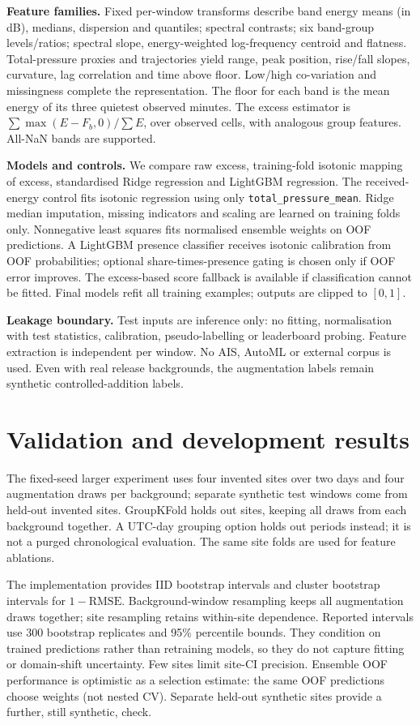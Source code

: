 \documentclass[a4paper,11pt]{article}
\begin{document}
\textbf{Feature families.} Fixed per-window transforms describe band energy
means (in dB), medians, dispersion and quantiles; spectral contrasts; six
band-group levels/ratios; spectral slope, energy-weighted log-frequency
centroid and flatness. Total-pressure proxies and trajectories yield range,
peak position, rise/fall slopes, curvature, lag correlation and time above
floor. Low/high co-variation and missingness complete the representation.
The floor for each band is the mean energy of its three quietest observed
minutes. The excess estimator is $\sum\max(E-F_b,0)/\sum E$, over observed
cells, with analogous group features. All-NaN bands are supported.

\textbf{Models and controls.} We compare raw excess, training-fold isotonic
mapping of excess, standardised Ridge regression and LightGBM regression.
The received-energy control fits isotonic regression using only
\texttt{total\_pressure\_mean}. Ridge median imputation, missing indicators
and scaling are learned on training folds only. Nonnegative least squares
fits normalised ensemble weights on OOF predictions. A LightGBM presence
classifier receives isotonic calibration from OOF probabilities; optional
share-times-presence gating is chosen only if OOF error improves. The
excess-based score fallback is available if classification cannot be fitted.
Final models refit all training examples; outputs are clipped to $[0,1]$.

\textbf{Leakage boundary.} Test inputs are inference only: no fitting,
normalisation with test statistics, calibration, pseudo-labelling or
leaderboard probing. Feature extraction is independent per window. No AIS,
AutoML or external corpus is used. Even with real release backgrounds,
the augmentation labels remain synthetic controlled-addition labels.

\newpage
\section{Validation and development results}
The fixed-seed larger experiment uses four invented sites over two days and
four augmentation draws per background; \HeldoutCount{} separate synthetic
test windows come from held-out invented sites. GroupKFold holds out sites,
keeping all draws from each background together. A UTC-day grouping option
holds out periods instead; it is not a purged chronological evaluation.
The same site folds are used for feature ablations.

The implementation provides IID bootstrap intervals and cluster bootstrap
intervals for $1-\mathrm{RMSE}$. Background-window resampling keeps all
augmentation draws together; site resampling retains within-site dependence.
Reported intervals use 300 bootstrap replicates and 95\% percentile bounds.
They condition on trained predictions rather than retraining models, so they
do not capture fitting or domain-shift uncertainty. Few sites limit site-CI
precision. Ensemble OOF performance is optimistic as a selection estimate:
the same OOF predictions choose weights (not nested CV). Separate held-out
synthetic sites provide a further, still synthetic, check.
\end{document}
